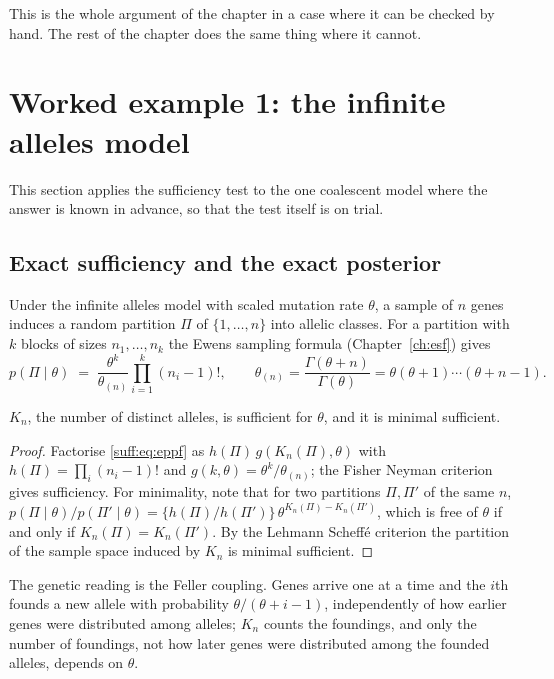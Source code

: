 This is the whole argument of the chapter in a case where it can be checked by hand. The rest
of the chapter does the same thing where it cannot.

\section{Worked example 1: the infinite alleles model}
\label{suff:sec:esf}

This section applies the sufficiency test to the one coalescent model where the answer is
known in advance, so that the test itself is on trial.

\subsection{Exact sufficiency and the exact posterior}
\label{suff:sec:esfpost}

Under the infinite alleles model with scaled mutation rate $\theta$, a sample of $n$ genes
induces a random partition $\Pi$ of $\{1,\dots,n\}$ into allelic classes. For a partition with
$k$ blocks of sizes $n_1,\dots,n_k$ the Ewens sampling formula (Chapter~\ref{ch:esf}) gives
\begin{equation}
p(\Pi\mid\theta) \;=\; \frac{\theta^{k}}{\theta_{(n)}}\prod_{i=1}^{k}(n_i-1)!,
\qquad \theta_{(n)}=\frac{\Gamma(\theta+n)}{\Gamma(\theta)}=\theta(\theta+1)\cdots(\theta+n-1).
\label{suff:eq:eppf}
\end{equation}

\begin{proposition}
\label{suff:prop:ewenssuff}
$K_n$, the number of distinct alleles, is sufficient for $\theta$, and it is minimal
sufficient.
\end{proposition}

\begin{proof}
Factorise \eqref{suff:eq:eppf} as $h(\Pi)\,g(K_n(\Pi),\theta)$ with $h(\Pi)=\prod_i(n_i-1)!$ and
$g(k,\theta)=\theta^k/\theta_{(n)}$; the Fisher Neyman criterion gives sufficiency. For
minimality, note that for two partitions $\Pi,\Pi'$ of the same $n$,
$p(\Pi\mid\theta)/p(\Pi'\mid\theta) = \{h(\Pi)/h(\Pi')\}\,\theta^{K_n(\Pi)-K_n(\Pi')}$,
which is free of $\theta$ if and only if $K_n(\Pi)=K_n(\Pi')$. By the Lehmann Scheff\'e
criterion the partition of the sample space induced by $K_n$ is minimal sufficient.
\end{proof}

The genetic reading is the Feller coupling. Genes arrive one at a time and the $i$th founds a
new allele with probability $\theta/(\theta+i-1)$, independently of how earlier genes were
distributed among alleles; $K_n$ counts the foundings, and only the number of foundings, not
how later genes were distributed among the founded alleles, depends on $\theta$.

